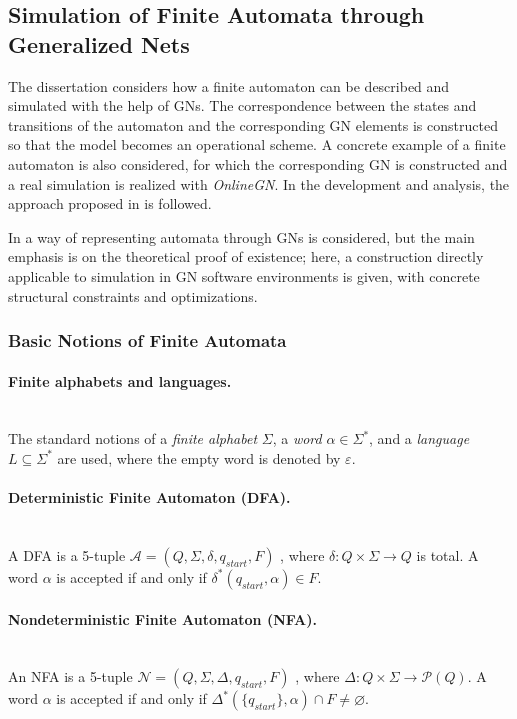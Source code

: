 	\subsection{Simulation of Finite Automata through Generalized Nets}
	
	\hspace*{2.5em}The dissertation considers how a finite automaton can be described and simulated with the help of GNs. The correspondence between the states and transitions of the automaton and the corresponding GN elements is constructed so that the model becomes an operational scheme. A concrete example of a finite automaton is also considered, for which the corresponding GN is constructed and a real simulation is realized with \textit{OnlineGN}. In the development and analysis, the approach proposed in \cite{DIS-DimitrievAutomata} is followed.
	
	In \cite{DIS-Atanassov1985GNFA} a way of representing automata through GNs is considered, but the main emphasis is on the theoretical proof of existence; here, a construction directly applicable to simulation in GN software environments is given, with concrete structural constraints and optimizations.
	
	\subsubsection{Basic Notions of Finite Automata}
	
	\paragraph*{Finite alphabets and languages.}
	\mbox{}\\
	The standard notions of a \emph{finite alphabet} $\Sigma$, a \emph{word} $\alpha \in \Sigma^*$, and a \emph{language} $L \subseteq \Sigma^*$ are used, where the empty word is denoted by $\varepsilon$.
	
	\paragraph*{Deterministic Finite Automaton (DFA).}
	\mbox{}\\
	A DFA is a 5-tuple $\mathcal{A}=(Q,\Sigma,\delta,q_{\textit{start}},F)$ \cite{DIS-HopcroftMotwaniUllman,DIS-Kozen}, where $\delta:Q\times\Sigma\to Q$ is total. A word $\alpha$ is accepted if and only if $\delta^*(q_{\textit{start}},\alpha)\in F$.
	
	\paragraph*{Nondeterministic Finite Automaton (NFA).}
	\mbox{}\\
	An NFA is a 5-tuple $\mathcal{N}=(Q,\Sigma,\Delta,q_{\textit{start}},F)$ \cite{DIS-HopcroftMotwaniUllman,DIS-Papadimitriou}, where $\Delta:Q\times\Sigma\to\mathcal{P}(Q)$. A word $\alpha$ is accepted if and only if $\Delta^*(\{q_{\textit{start}}\},\alpha)\cap F\neq\varnothing$.
	
